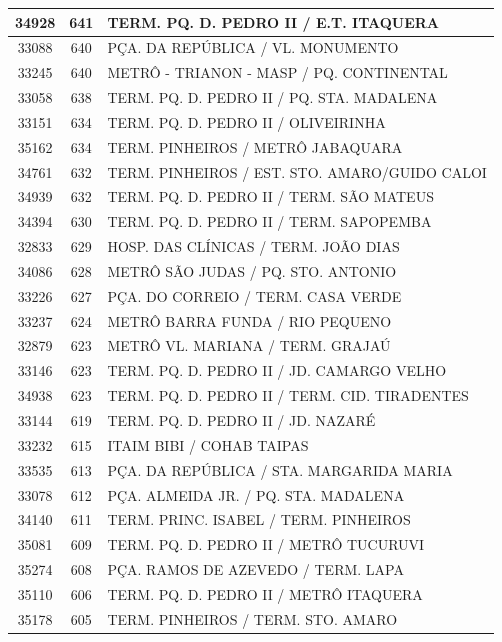 \documentclass[
	12pt,				%
	oneside,			%
	a4paper,			%
	english,			%
	brazil				%
	]{abntex2ppgsi}
\begin{document}
{{\begin{apendicesenv}
\begin{longtable}{c|c|p{7cm}}
 \hline 
34928 &	641 &	TERM. PQ. D. PEDRO II / E.T. ITAQUERA \\ 
 \hline 
33088 &	640 &	PÇA. DA REPÚBLICA / VL. MONUMENTO \\ 
 \hline 
33245 &	640 &	METRÔ - TRIANON - MASP / PQ. CONTINENTAL \\ 
 \hline 
33058 &	638 &	TERM. PQ. D. PEDRO II / PQ. STA. MADALENA \\ 
 \hline 
33151 &	634 &	TERM. PQ. D. PEDRO II / OLIVEIRINHA \\ 
 \hline 
35162 &	634 &	TERM. PINHEIROS / METRÔ JABAQUARA \\ 
 \hline 
34761 &	632 &	TERM. PINHEIROS / EST. STO. AMARO/GUIDO CALOI \\ 
 \hline 
34939 &	632 &	TERM. PQ. D. PEDRO II / TERM. SÃO MATEUS \\ 
 \hline 
34394 &	630 &	TERM. PQ. D. PEDRO II / TERM. SAPOPEMBA \\ 
 \hline 
32833 &	629 &	HOSP. DAS CLÍNICAS / TERM. JOÃO DIAS \\ 
 \hline 
34086 &	628 &	METRÔ SÃO JUDAS / PQ. STO. ANTONIO \\ 
 \hline 
33226 &	627 &	PÇA. DO CORREIO / TERM. CASA VERDE \\ 
 \hline 
33237 &	624 &	METRÔ BARRA FUNDA / RIO PEQUENO \\ 
 \hline 
32879 &	623 &	METRÔ VL. MARIANA / TERM. GRAJAÚ \\ 
 \hline 
33146 &	623 &	TERM. PQ. D. PEDRO II / JD. CAMARGO VELHO \\ 
 \hline 
34938 &	623 &	TERM. PQ. D. PEDRO II / TERM. CID. TIRADENTES \\ 
 \hline 
33144 &	619 &	TERM. PQ. D. PEDRO II / JD. NAZARÉ \\ 
 \hline 
33232 &	615 &	ITAIM BIBI / COHAB TAIPAS \\ 
 \hline 
33535 &	613 &	PÇA. DA REPÚBLICA / STA. MARGARIDA MARIA \\ 
 \hline 
33078 &	612 &	PÇA. ALMEIDA JR. / PQ. STA. MADALENA \\ 
 \hline 
34140 &	611 &	TERM. PRINC. ISABEL / TERM. PINHEIROS \\ 
 \hline 
35081 &	609 &	TERM. PQ. D. PEDRO II / METRÔ TUCURUVI \\ 
 \hline 
35274 &	608 &	PÇA. RAMOS DE AZEVEDO / TERM. LAPA \\ 
 \hline 
35110 &	606 &	TERM. PQ. D. PEDRO II / METRÔ ITAQUERA \\ 
 \hline 
35178 &	605 &	TERM. PINHEIROS / TERM. STO. AMARO \\ 

\end{longtable}
\end{apendicesenv}}}
\end{document}
